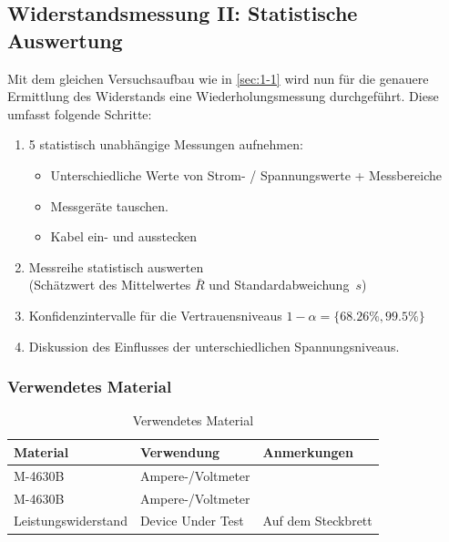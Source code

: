 \subsection{Widerstandsmessung II: Statistische Auswertung}\label{sec:1-2}

\begin{highlightblock}
	Mit dem gleichen Versuchsaufbau wie in \autoref{sec:1-1} wird nun
	für die genauere Ermittlung des Widerstands eine Wiederholungsmessung
	durchgeführt. Diese umfasst folgende Schritte:
	\begin{enumerate}[label=\textbf{\alph*:}, ref=\alph*,noitemsep]
		\item\label{itm:1-P2-1} 5 statistisch unabhängige Messungen aufnehmen:
		\begin{itemize}[noitemsep]
			\item Unterschiedliche Werte von Strom- / Spannungswerte + Messbereiche
			\item Messgeräte tauschen.
			\item Kabel ein- und ausstecken
		\end{itemize}
		\item\label{itm:1-P2-2} Messreihe statistisch auswerten\\(Schätzwert des Mittelwertes $\bar{R}$ und Standardabweichung~$s$)
		\item\label{itm:1-P2-3} Konfidenzintervalle für die Vertrauensniveaus $1-\alpha =\{68.26\%, 99.5\%\}$
		\item\label{itm:1-P2-4} Diskussion des Einflusses der unterschiedlichen Spannungsniveaus.
	\end{enumerate}
\end{highlightblock}

\subsubsection{Verwendetes Material}

\begin{table}[h]
	\centering
	\caption{Verwendetes Material}
	\begin{tabularx}{\textwidth}{XXX}
		\textbf{Material}   & \textbf{Verwendung} & \textbf{Anmerkungen} \\ \midrule
		M-4630B             & Ampere-/Voltmeter   &                      \\
		M-4630B             & Ampere-/Voltmeter   &                      \\
		Leistungswiderstand & Device Under Test   & Auf dem Steckbrett   \\
	\end{tabularx}
\end{table}

